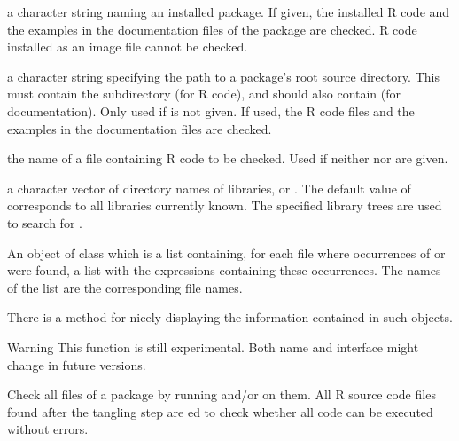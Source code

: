 \begin{Arguments}
\begin{ldescription}
\item[\code{package}] a character string naming an installed package.  If
given, the installed R code and the examples in the documentation
files of the package are checked.  R code installed as an image file
cannot be checked.
\item[\code{dir}] a character string specifying the path to a package's root
source directory.  This must contain the subdirectory  (for
R code), and should also contain  (for documentation).
Only used if  is not given.  If used, the R code files
and the examples in the documentation files are checked.
\item[\code{file}] the name of a file containing R code to be checked.  Used
if neither  nor  are given.
\item[\code{lib.loc}] a character vector of directory names of \R{} libraries,
or .  The default value of  corresponds to all
libraries currently known.  The specified library trees are used to
search for .
\end{ldescription}
\end{Arguments}
%
\begin{Value}
An object of class  which is a list containing, for
each file where occurrences of  or  were found, a list
with the expressions containing these occurrences.  The names of the
list are the corresponding file names.

There is a  method for nicely displaying the information
contained in such objects.
\end{Value}
%
\begin{Section}{Warning}
This function is still experimental.  Both name and interface might
change in future versions.
\end{Section}
%
\begin{Description}\relax
Check all  files of a package by running
 and/or  on them. All
R source code files found after the tangling step are
ed to check whether all code can be
executed without errors.
\end{Description}
